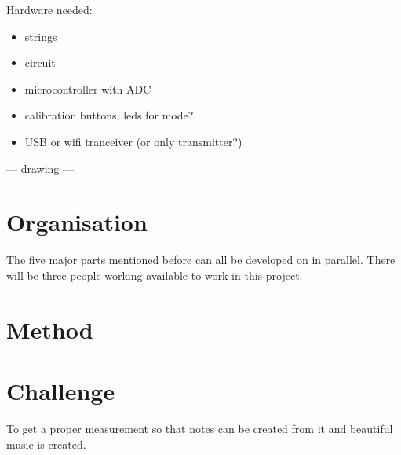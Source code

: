 \documentclass{article}
\begin{document}
Hardware needed:
\begin{itemize}
    \item strings
    \item circuit
    \item microcontroller with ADC
    \item calibration buttons, leds for mode?
    \item USB or wifi tranceiver (or only transmitter?)
\end{itemize}

--- drawing ---


\section{Organisation}
The five major parts mentioned before can all be developed on in parallel. There will be three people working available to work in this project.

\section{Method}

\section{Challenge}
To get a proper measurement so that notes can be created from it and beautiful music is created.
\end{document}
